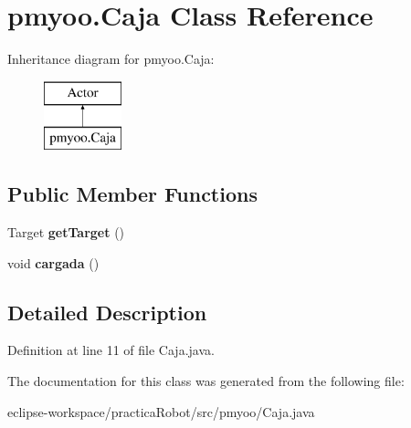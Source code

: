 \hypertarget{classpmyoo_1_1_caja}{}\section{pmyoo.\+Caja Class Reference}
\label{classpmyoo_1_1_caja}
Inheritance diagram for pmyoo.\+Caja\+:\begin{figure}[H]
\begin{center}
\leavevmode
\includegraphics[height=2.000000cm]{classpmyoo_1_1_caja}
\end{center}
\end{figure}
\subsection*{Public Member Functions}
\begin{DoxyCompactItemize}
\item 
\mbox{\label{classpmyoo_1_1_caja_a204316abd186f845190949d57772419b}} 
Target {\bfseries get\+Target} ()
\item 
\mbox{\label{classpmyoo_1_1_caja_a88d192e4cb84c7aa253626163fc244bb}} 
void {\bfseries cargada} ()
\end{DoxyCompactItemize}


\subsection{Detailed Description}


Definition at line 11 of file Caja.\+java.



The documentation for this class was generated from the following file\+:\begin{DoxyCompactItemize}
\item 
eclipse-\/workspace/practica\+Robot/src/pmyoo/Caja.\+java\end{DoxyCompactItemize}
